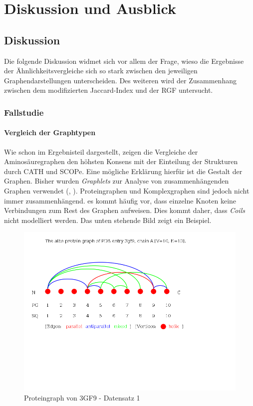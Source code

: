 \documentclass{report}
\begin{document}
\chapter{Diskussion und Ausblick}



\section{Diskussion}

Die folgende Diskussion widmet sich vor allem der Frage, wieso die Ergebnisse der \"Ahnlichkeitsvergleiche sich so stark zwischen den jeweiligen Graphendarstellungen unterscheiden.
Des weiteren wird der Zusammenhang zwischen dem modifizierten Jaccard-Index und der RGF untersucht.

\subsection{Fallstudie}
\subsubsection{Vergleich der Graphtypen}

Wie schon im Ergebnisteil dargestellt, zeigen die Vergleiche der Aminos\"auregraphen den h\"ohsten Konsens mit der Einteilung der Strukturen durch CATH und SCOPe. Eine m\"ogliche Erkl\"arung hierf\"ur ist die Gestalt der Graphen. Bisher wurden \textit{Graphlets} zur Analyse von zusammenh\"angenden Graphen verwendet (\cite{sherv_graphlets}, \cite{graphletfrequency}).
Proteingraphen und Komplexgraphen sind jedoch nicht immer zusammenh\"angend. es kommt h\"aufig vor, dass einzelne Knoten keine Verbindungen zum Rest des Graphen aufweisen. Dies kommt daher, dass \textit{Coils} nicht modelliert werden. Das unten stehende Bild zeigt ein Beispiel.

\begin{figure}[h!]
\includegraphics[scale=0.5]{3gf9_A_albe_PG.png}
\caption{Proteingraph von 3GF9 - Datensatz 1}
\end{figure}
\end{document}
